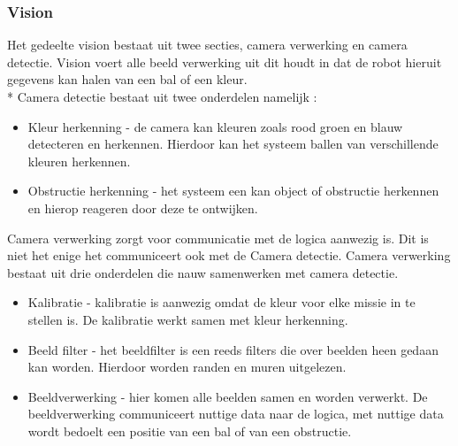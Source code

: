 \documentclass[12pt]{article} %
\begin{document}
\subsubsection{Vision}
Het gedeelte vision bestaat uit twee secties, camera verwerking en camera detectie. Vision voert alle beeld verwerking uit dit houdt in dat de robot hieruit gegevens kan halen van een bal of een kleur. \\*
Camera detectie bestaat uit twee onderdelen namelijk :
\begin{itemize}
\item Kleur herkenning - de camera kan kleuren zoals rood groen en blauw detecteren en herkennen. Hierdoor kan het systeem ballen van verschillende kleuren herkennen.
\item Obstructie herkenning - het systeem een kan object of obstructie herkennen en hierop reageren door deze te ontwijken.
\end{itemize}
Camera verwerking zorgt voor communicatie met de logica  aanwezig is. Dit is niet het enige het communiceert ook met de Camera detectie. Camera verwerking bestaat uit drie onderdelen die nauw samenwerken met camera detectie.
\begin{itemize}
\item Kalibratie - kalibratie is aanwezig omdat de kleur voor elke missie in te stellen is. De kalibratie werkt samen met kleur herkenning.
\item Beeld filter - het beeldfilter is een reeds filters die over beelden heen gedaan kan worden. Hierdoor worden randen en muren uitgelezen.
\item Beeldverwerking - hier komen alle beelden samen en worden verwerkt. De beeldverwerking communiceert nuttige data naar de logica, met nuttige data wordt bedoelt een positie van een bal of van een obstructie.
\end{itemize}

\newpage
\end{document}
